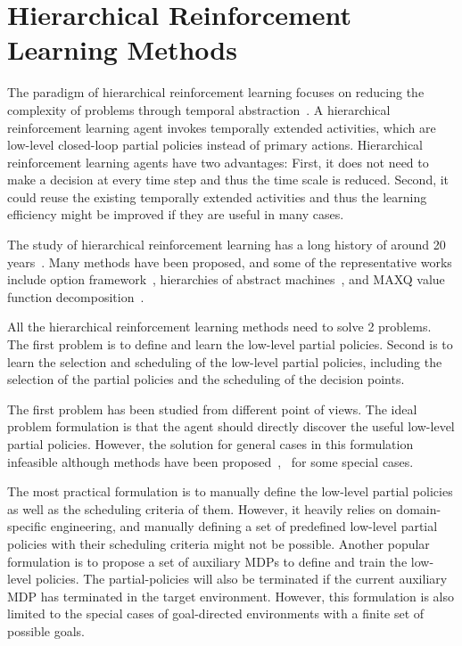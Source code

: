 \section{Hierarchical Reinforcement Learning Methods}

The paradigm of hierarchical reinforcement learning focuses on reducing the complexity of problems through temporal abstraction~\cite{barto2003recent}. A hierarchical reinforcement learning agent invokes temporally extended activities, which are low-level closed-loop partial policies instead of primary actions. Hierarchical reinforcement learning agents have two advantages: First, it does not need to make a decision at every time step and thus the time scale is reduced. Second, it could reuse the existing temporally extended activities and thus the learning efficiency might be improved if they are useful in many cases.

The study of hierarchical reinforcement learning has a long history of around 20 years~\cite{sutton1999between}. Many methods have been proposed,  and some of the representative works include option framework~\cite{sutton1999between}, hierarchies of abstract machines~\cite{parr1998reinforcement}, and MAXQ value function decomposition~\cite{dietterich2000hierarchical}.

All the hierarchical reinforcement learning methods need to solve 2 problems. The first problem is to define and learn the low-level partial policies. Second is to learn the selection and scheduling of the low-level partial policies, including the selection of the partial policies and the scheduling of the decision points.

The first problem has been studied from different point of views. The ideal problem formulation is that the agent should directly discover the useful low-level partial policies. However, the solution for general cases in this formulation infeasible although methods have been proposed~\cite{mcgovern2001automatic},~\cite{hengst2002discovering} for some special cases. 

The most practical formulation is to manually define the low-level partial policies as well as the scheduling criteria of them. However, it heavily relies on domain-specific engineering, and manually defining a set of predefined low-level partial policies with their scheduling criteria might not be possible. Another popular formulation is to propose a set of auxiliary MDPs to define and train the low-level policies. The partial-policies will also be terminated if the current auxiliary MDP has terminated in the target environment. However, this formulation is also limited to the special cases of goal-directed environments with a finite set of possible goals. 

